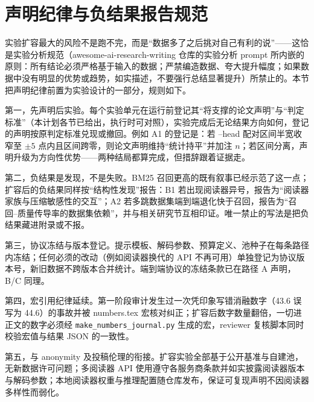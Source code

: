 \section{声明纪律与负结果报告规范}
\label{sec:discipline}

实验扩容最大的风险不是跑不完，而是``数据多了之后挑对自己有利的说''——这恰是实验分析规范（awesome-ai-research-writing 仓库的实验分析 prompt 所内嵌的原则：所有结论必须严格基于输入的数据；严禁编造数据、夸大提升幅度；如果数据中没有明显的优势或趋势，如实描述，不要强行总结显著提升）所禁止的。本节把声明纪律前置为实验设计的一部分，规则如下。

第一，先声明后实验。每个实验单元在运行前登记其``将支撑的论文声明''与``判定标准''（本计划各节已给出，执行时可对照），实验完成后无论结果方向如何，登记的声明按原判定标准兑现或撤回。例如 A1 的登记是：若 \sieve{}--head 配对区间半宽收窄至 $\pm 5$ 点内且区间跨零，则论文声明维持``统计持平''并加注 $n$；若区间分离，声明升级为方向性优势——两种结局都算完成，但措辞跟着证据走。

第二，负结果是发现，不是失败。BM25 召回更高的既有叙事已经示范了这一点；扩容后的负结果同样按``结构性发现''报告：B1 若出现阅读器异号，报告为``阅读器家族与压缩敏感性的交互''；A2 若多跳数据集端到端退化快于召回，报告为``召回--质量传导率的数据集依赖''，并与相关研究节互相印证。唯一禁止的写法是把负结果藏进附录或不报。

第三，协议冻结与版本登记。提示模板、解码参数、预算定义、池种子在每条路径内冻结；任何必须的改动（例如阅读器换代的 API 不再可用）单独登记为协议版本号，新旧数据不跨版本合并统计。端到端协议的冻结条款已在路径 A 声明，B/C 同理。

第四，宏引用纪律延续。第一阶段审计发生过一次凭印象写错消融数字（43.6 误写为 44.6）的事故并被 numbers.tex 宏核对纠正；扩容后数字数量翻倍，一切进正文的数字必须经 \texttt{make\_numbers\_journal.py} 生成的宏，reviewer 复核脚本同时校验宏值与结果 JSON 的一致性。

第五，与 anonymity 及投稿伦理的衔接。扩容实验全部基于公开基准与自建池，无新数据许可问题；多阅读器 API 使用遵守各服务商条款并如实披露阅读器版本与解码参数；本地阅读器权重与推理配置随仓库发布，保证可复现声明不因阅读器多样性而弱化。
